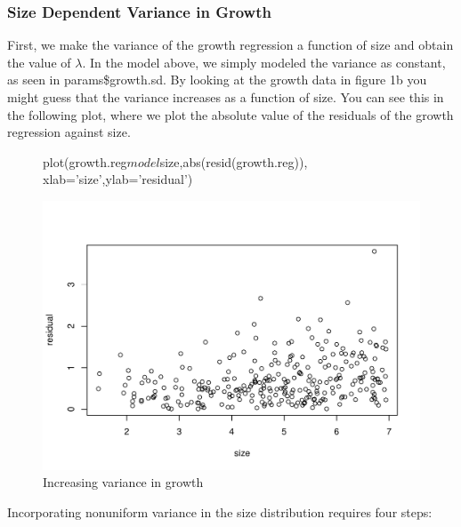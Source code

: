 \documentclass[11pt]{article}
\begin{document}

\subsubsection{Size Dependent Variance in Growth}
\label{subsec:Size Dependent Variance in Growth}

First, we make the variance of the growth regression a function of size and obtain the value of $\lambda$. In the model above, we simply modeled the variance as constant, as seen in params\$growth.sd. By looking at the growth data in figure 1b you might guess that the variance increases as a function of size. You can see this in the following plot, where we plot the absolute value of the residuals of the growth regression against size.

\begin{figure}[H]
\begin{center}
\begin{Schunk}
\begin{Sinput}
   plot(growth.reg$model$size,abs(resid(growth.reg)),
      xlab='size',ylab='residual')
\end{Sinput}
\end{Schunk}
\includegraphics{IPM_Guide_Appendix_A-fig4}
\caption{Increasing variance in growth}
\label{fig:figA4}
\end{center}
\end{figure}

Incorporating nonuniform variance in the size distribution requires four  steps:
\end{document}
